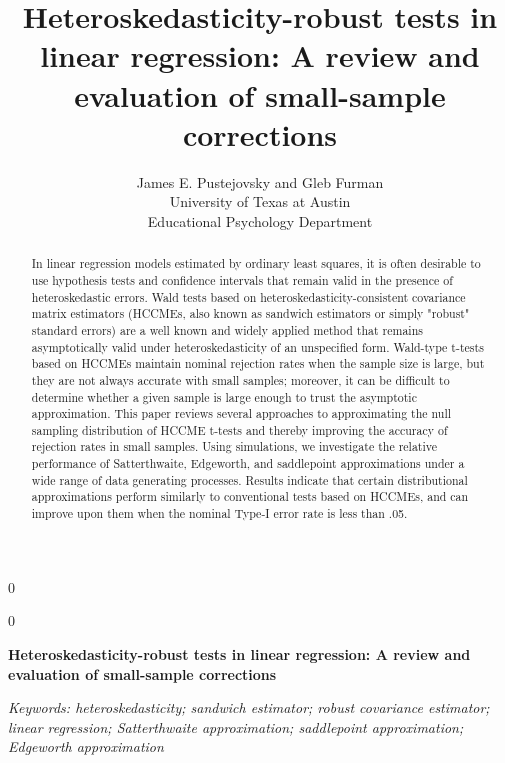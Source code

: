 \documentclass[12pt]{article}\usepackage[]{graphicx}\usepackage[]{color}
\newcommand{\blind}{0}
\newcommand{\MyTitle}{Heteroskedasticity-robust tests in linear regression: A review and evaluation of small-sample corrections}
\begin{document}
%

\def\spacingset#1{\renewcommand{\baselinestretch}%
{#1}\small\normalsize} \spacingset{1}



\blind
{
  \title{\bf \MyTitle}
  \author{James E. Pustejovsky and Gleb Furman \\
    University of Texas at Austin \\
    Educational Psychology Department}
  \maketitle
} \fi

\blind
{
  \bigskip
  \bigskip
  \bigskip
  \begin{center}
    {\LARGE\bf \MyTitle}
\end{center}
  \medskip
} \fi

\bigskip
\begin{abstract}
In linear regression models estimated by ordinary least squares, it is often desirable to use hypothesis tests and confidence intervals that remain valid in the presence of heteroskedastic errors. 
Wald tests based on heteroskedasticity-consistent covariance matrix estimators (HCCMEs, also known as sandwich estimators or simply "robust" standard errors) are a well known and widely applied method that remains asymptotically valid under heteroskedasticity of an unspecified form.
Wald-type t-tests based on HCCMEs maintain nominal rejection rates when the sample size is large, but they are not always accurate with small samples; moreover, it can be difficult to determine whether a given sample is large enough to trust the asymptotic approximation.
This paper reviews several approaches to approximating the null sampling distribution of HCCME t-tests and thereby improving the accuracy of rejection rates in small samples.
Using simulations, we investigate the relative performance of Satterthwaite, Edgeworth, and saddlepoint approximations under a wide range of data generating processes.
Results indicate that certain distributional approximations perform similarly to conventional tests based on HCCMEs, and can improve upon them when the nominal Type-I error rate is less than .05. 
\end{abstract}

\noindent%
{\it Keywords: heteroskedasticity; sandwich estimator; robust covariance estimator; linear regression; Satterthwaite approximation; saddlepoint approximation; Edgeworth approximation} 
\vfill
\end{document}
